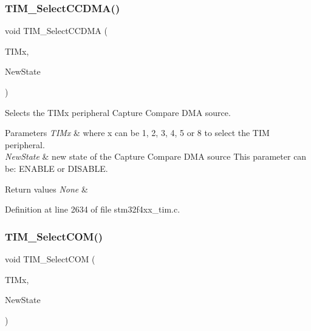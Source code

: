 \subsubsection{\texorpdfstring{T\+I\+M\+\_\+\+Select\+C\+C\+D\+M\+A()}{TIM\_SelectCCDMA()}}
{\footnotesize\ttfamily void T\+I\+M\+\_\+\+Select\+C\+C\+D\+MA (\begin{DoxyParamCaption}\item[{\hyperlink{struct_t_i_m___type_def}{T\+I\+M\+\_\+\+Type\+Def} $\ast$}]{T\+I\+Mx,  }\item[{Functional\+State}]{New\+State }\end{DoxyParamCaption})}



Selects the T\+I\+Mx peripheral Capture Compare D\+MA source. 


\begin{DoxyParams}{Parameters}
{\em T\+I\+Mx} & where x can be 1, 2, 3, 4, 5 or 8 to select the T\+IM peripheral. \\
\hline
{\em New\+State} & new state of the Capture Compare D\+MA source This parameter can be\+: E\+N\+A\+B\+LE or D\+I\+S\+A\+B\+LE. \\
\hline
\end{DoxyParams}

\begin{DoxyRetVals}{Return values}
{\em None} & \\
\hline
\end{DoxyRetVals}


Definition at line 2634 of file stm32f4xx\+\_\+tim.\+c.

\mbox{\label{group___t_i_m_gaff2e7f9959b1b36e830df028c14accc8}} 
\subsubsection{\texorpdfstring{T\+I\+M\+\_\+\+Select\+C\+O\+M()}{TIM\_SelectCOM()}}
{\footnotesize\ttfamily void T\+I\+M\+\_\+\+Select\+C\+OM (\begin{DoxyParamCaption}\item[{\hyperlink{struct_t_i_m___type_def}{T\+I\+M\+\_\+\+Type\+Def} $\ast$}]{T\+I\+Mx,  }\item[{Functional\+State}]{New\+State }\end{DoxyParamCaption})}



